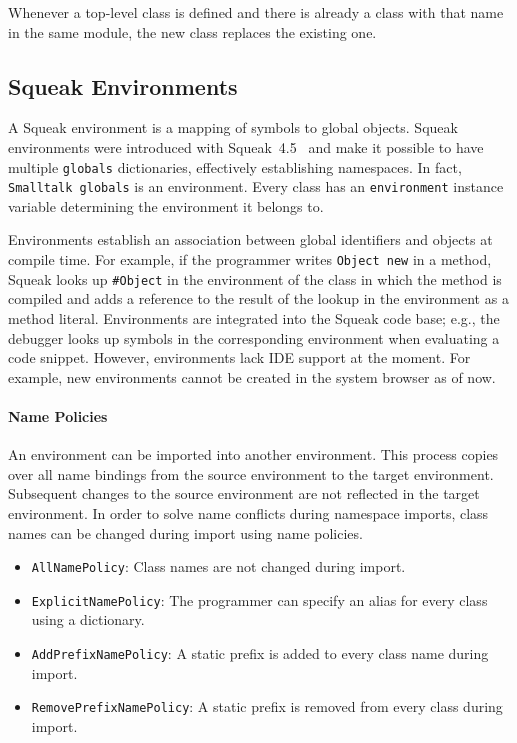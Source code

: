 Whenever a top-level class is defined and there is already a class with that name in the same module, the new class replaces the existing one.

\subsection{Squeak Environments}
\label{sec:rel_sq_env}
A Squeak environment is a mapping of symbols to global objects. Squeak environments were introduced with Squeak~4.5~\cite{squeak45notes} and make it possible to have multiple \texttt{globals} dictionaries, effectively establishing namespaces. In fact, \texttt{Smalltalk globals} is an environment. Every class has an \texttt{environment} instance variable determining the environment it belongs to.

Environments establish an association between global identifiers and objects at compile time. For example, if the programmer writes \texttt{Object new} in a method, Squeak looks up \texttt{\#Object} in the environment of the class in which the method is compiled and adds a reference to the result of the lookup in the environment as a method literal. Environments are integrated into the Squeak code base; e.g., the debugger looks up symbols in the corresponding environment when evaluating a code snippet. However, environments lack IDE support at the moment. For example, new environments cannot be created in the system browser as of now.

\paragraph{Name Policies}
An environment can be imported into another environment. This process copies over all name bindings from the source environment to the target environment. Subsequent changes to the source environment are not reflected in the target environment. In order to solve name conflicts during namespace imports, class names can be changed during import using name policies.

\begin{itemize}
    \item \texttt{AllNamePolicy}: Class names are not changed during import.
    \item \texttt{ExplicitNamePolicy}: The programmer can specify an alias for every class using a dictionary.
    \item \texttt{AddPrefixNamePolicy}: A static prefix is added to every class name during import.
    \item \texttt{RemovePrefixNamePolicy}: A static prefix is removed from every class during import.
\end{itemize}

